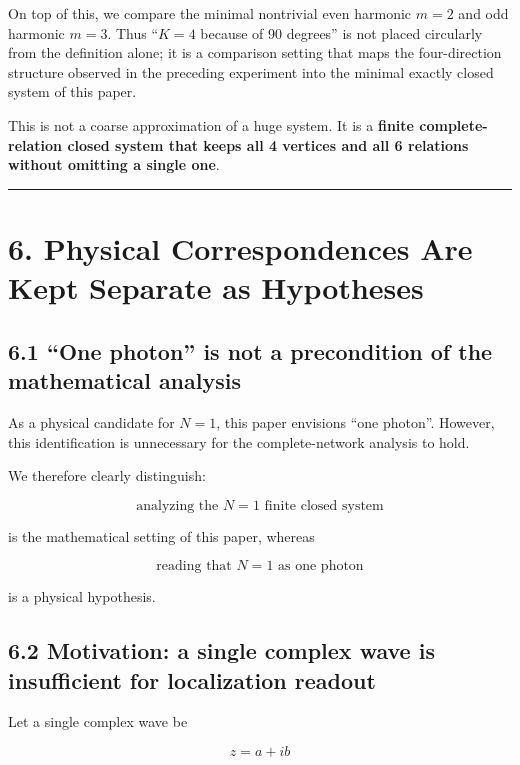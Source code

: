 \documentclass[
  a4paper,
]{article}
\begin{document}
On top of this, we compare the minimal nontrivial even harmonic \(m=2\)
and odd harmonic \(m=3\). Thus ``\(K=4\) because of 90 degrees'' is not
placed circularly from the definition alone; it is a comparison setting
that maps the four-direction structure observed in the preceding
experiment into the minimal exactly closed system of this paper.

This is not a coarse approximation of a huge system. It is a
\textbf{finite complete-relation closed system that keeps all 4 vertices
and all 6 relations without omitting a single one}.

\begin{center}\rule{0.5\linewidth}{0.5pt}\end{center}

\section{6. Physical Correspondences Are Kept Separate as
Hypotheses}\label{physical-correspondences-are-kept-separate-as-hypotheses}

\subsection{6.1 ``One photon'' is not a precondition of the mathematical
analysis}\label{one-photon-is-not-a-precondition-of-the-mathematical-analysis}

As a physical candidate for \(N=1\), this paper envisions ``one
photon''. However, this identification is unnecessary for the
complete-network analysis to hold.

We therefore clearly distinguish:

\[
\boxed{
\text{analyzing the }N=1\text{ finite closed system}
}
\]

is the mathematical setting of this paper, whereas

\[
\boxed{\text{reading that }N=1\text{ as one photon}}
\]

is a physical hypothesis.

\subsection{6.2 Motivation: a single complex wave is insufficient for
localization
readout}\label{motivation-a-single-complex-wave-is-insufficient-for-localization-readout}

Let a single complex wave be

\[
z
=
a+ib
\]
\end{document}
